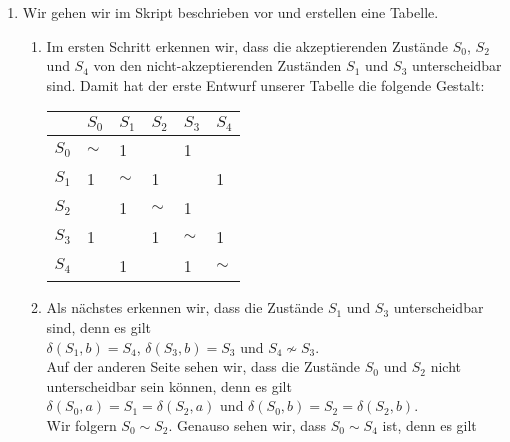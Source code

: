 \documentclass{article}
\begin{document}
\begin{enumerate}
\item Wir gehen wir im Skript beschrieben vor und erstellen eine Tabelle.
      \begin{enumerate}
      \item Im ersten Schritt erkennen wir, dass die akzeptierenden Zust\"ande $S_0$,
            $S_2$ und $S_4$ von den nicht-akzeptierenden Zust\"anden $S_1$ und $S_3$ unterscheidbar sind.
            Damit hat der erste Entwurf unserer  Tabelle die folgende Gestalt:
            \begin{center}        
            \begin{tabular}[t]{|l||l|l|l|l|l|}
            \hline
                  &$S_0$&$S_1$&$S_2$&$S_3$&$S_4$ \\
            \hline
            \hline
            $S_0$ &$\sim$&  1  &     &  1  &     \\
            \hline
            $S_1$ &  1  &$\sim$&  1  &     &  1  \\
            \hline
            $S_2$ &     &  1  &$\sim$&  1  &     \\
            \hline
            $S_3$ &  1  &     &  1  &$\sim$&  1  \\
            \hline
            $S_4$ &     &  1  &     &  1  &$\sim$\\
            \hline
            \end{tabular}
            \end{center}
      \item Als n\"achstes erkennen wir, dass die Zust\"ande $S_1$ und $S_3$ unterscheidbar sind,
            denn es gilt 
            \\[0.2cm]
            \hspace*{1.3cm}
            $\delta(S_1,b) = S_4$, \quad $\delta(S_3,b) = S_3$ \quad und \quad $S_4 \not\sim S_3$.
            \\[0.2cm]
            Auf der anderen Seite sehen wir, dass die Zust\"ande $S_0$ und $S_2$ nicht
            unterscheidbar sein k\"onnen, denn es gilt
            \\[0.2cm]
            \hspace*{1.3cm}
            $\delta(S_0,a) = S_1 = \delta(S_2,a)$ \quad und 
            $\delta(S_0,b) = S_2 = \delta(S_2,b)$.
            \\[0.2cm]
            Wir folgern $S_0 \sim S_2$.  Genauso sehen wir, dass $S_0 \sim S_4$ ist, denn
            es gilt
            \\[0.2cm]

\end{enumerate}
\end{enumerate}
\end{document}
